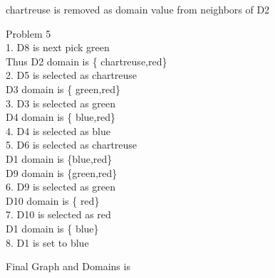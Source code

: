 \documentclass{article}
\begin{document}
chartreuse is removed as domain value from neighbors of D2 \\

\vspace{5mm}

\begin{p5}
Problem 5 \\

1. D8 is next pick green\\
	Thus D2 domain is \left\{ {chartreuse,red}\right\} \\

2. D5 is selected as chartreuse \\
   D3 domain is \left\{ {green,red}\right\} \\

3. D3 is selected as green \\
   D4 domain is \left\{ {blue,red}\right\} \\

4. D4 is selected as blue \\

5. D6 is selected as chartreuse \\
   D1 domain is \left\{{blue,red}\right\} \\
	D9 domain is \left\{{green,red}\right\} \\

6. D9 is selected as green \\
   D10 domain is \left\{ {red}\right\} \\

7. D10 is selected as red \\
   D1 domain is \left\{ {blue}\right\} \\

8. D1 is set to blue
\end{p5}
Final Graph and Domains is \\
\\
\end{document}
